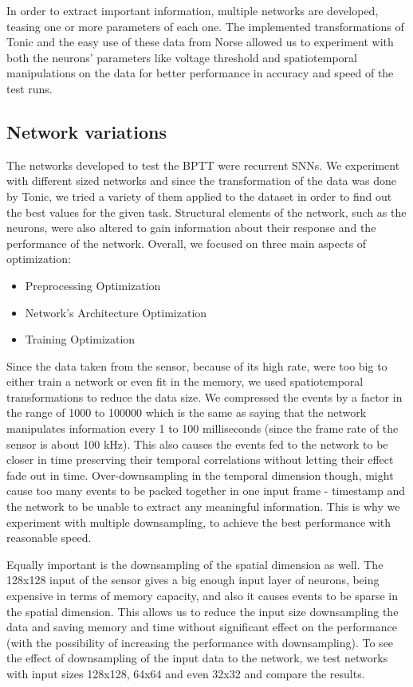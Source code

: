 \documentclass[12pt]{report}
\begin{document}
In order to extract important information, multiple networks are developed, teasing one or more parameters of each one. The implemented transformations of Tonic and the easy use of these data from Norse allowed us to experiment with both the neurons' parameters like voltage threshold and spatiotemporal manipulations on the data for better performance in accuracy and speed of the test runs.

\subsection{Network variations}

The networks developed to test the BPTT were recurrent SNNs. We experiment with different sized networks and since the transformation of the data was done by Tonic, we tried a variety of them applied to the dataset in order to find out the best values for the given task. Structural elements of the network, such as the neurons, were also altered to gain information about their response and the performance of the network. Overall, we focused on three main aspects of optimization:

\begin{itemize}
    \item Preprocessing Optimization
    \item Network's Architecture Optimization
    \item Training Optimization
\end{itemize}

Since the data taken from the sensor, because of its high rate, were too big to either train a network or even fit in the memory, we used spatiotemporal transformations to reduce the data size. We compressed the events by a factor in the range of 1000 to 100000 which is the same as saying that the network manipulates information every 1 to 100 milliseconds (since the frame rate of the sensor is about 100 kHz). This also causes the events fed to the network to be closer in time preserving their temporal correlations without letting their effect fade out in time. Over-downsampling in the temporal dimension though, might cause too many events to be packed together in one input frame - timestamp and the network to be unable to extract any meaningful information. This is why we experiment with multiple downsampling, to achieve the best performance with reasonable speed. 

Equally important is the downsampling of the spatial dimension as well. The 128x128 input of the sensor gives a big enough input layer of neurons, being expensive in terms of memory capacity, and also it causes events to be sparse in the spatial dimension. This allows us to reduce the input size downsampling the data and saving memory and time without significant effect on the performance (with the possibility of increasing the performance with downsampling). To see the effect of downsampling of the input data to the network, we test networks with input sizes 128x128, 64x64 and even 32x32 and compare the results.
\end{document}
